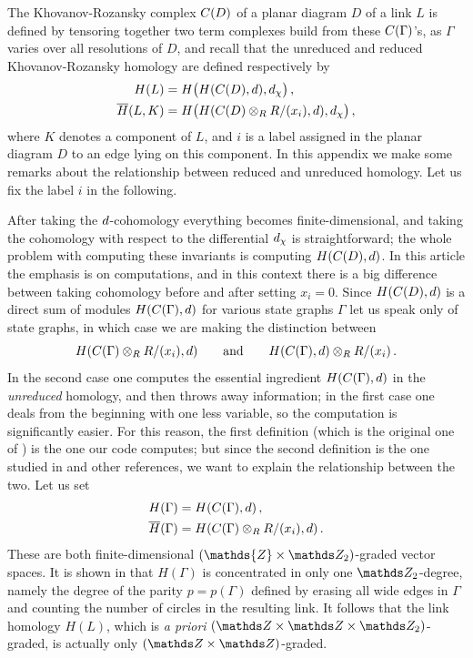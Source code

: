 \documentclass{compositio}
\theoremstyle{definition}
\numberwithin{equation}{section}
\begin{document}
The Khovanov-Rozansky complex $C(D)$ of a planar diagram $D$ of a link $L$ is defined by tensoring together two term complexes build from these $C(\Gamma)$'s, as $\Gamma$ varies over all resolutions of $D$, and recall that the unreduced and reduced Khovanov-Rozansky homology are defined respectively by
\begin{align*}
H(L) &= H\big( H(C(D),d), d_{\chi} \big) \, ,\\
\overline{H}(L, K) &= H\big( H( C(D) \otimes_{R} R/(x_i), d), d_{\chi} \big) \, ,
\end{align*}
where $K$ denotes a component of $L$, and $i$ is a label assigned in the planar diagram $D$ to an edge lying on this component. In this appendix we make some remarks about the relationship between reduced and unreduced homology. Let us fix the label $i$ in the following.

After taking the $d$-cohomology everything becomes finite-dimensional, and taking the cohomology with respect to the differential $d_{\chi}$ is straightforward; the whole problem with computing these invariants is computing $H(C(D), d)$. In this article the emphasis is on computations, and in this context there is a big difference between taking cohomology before and after setting $x_i = 0$. Since $H(C(D), d)$ is a direct sum of modules $H(C(\Gamma), d)$ for various state graphs $\Gamma$ let us speak only of state graphs, in which case we are making the distinction between
\[
H(C(\Gamma) \otimes_R R/(x_i), d ) \qquad \text{and} \qquad H( C(\Gamma), d ) \otimes_R R/(x_i) \, .
\]
In the second case one computes the essential ingredient $H( C(\Gamma), d )$ in the \emph{unreduced} homology, and then throws away information; in the first case one deals from the beginning with one less variable, so the computation is significantly easier. For this reason, the first definition (which is the original one of \cite{kr0401268}) is the one our code computes; but since the second definition is the one studied in \cite{r0607544} and other references, we want to explain the relationship between the two. Let us set
\begin{align*}
H(\Gamma) &= H( C(\Gamma), d ) \, ,\\
\overline{H}(\Gamma) &= H( C(\Gamma) \otimes_R R/(x_i), d ) \, .
\end{align*}
These are both finite-dimensional $(\mathds{Z} \times \Ztwo)$-graded vector spaces. It is shown in \cite{kr0401268} that $H(\Gamma)$ is concentrated in only one $\Ztwo$-degree, namely the degree of the parity $p = p(\Gamma)$ defined by erasing all wide edges in $\Gamma$ and counting the number of circles in the resulting link. It follows that the link homology $H(L)$, which is \emph{a priori} $(\ZZ \times \ZZ \times \Ztwo)$-graded, is actually only $(\ZZ \times \ZZ)$-graded.
\end{document}
